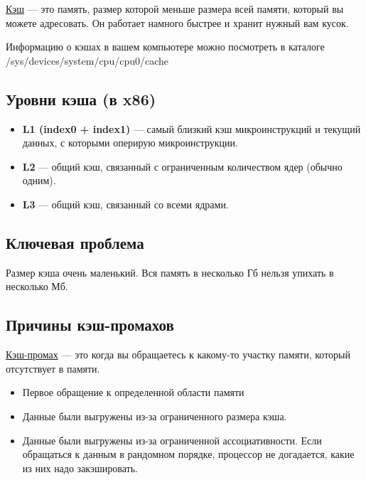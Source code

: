 \begin{Def}
	\underline{Кэш} --- это память, размер которой меньше размера всей памяти, который вы
	можете адресовать. Он работает намного быстрее и хранит нужный вам кусок.
\end{Def}

Информацию о кэшах в вашем компьютере можно посмотреть в каталоге
/sys/devices/system/cpu/cpu0/cache

\subsection{Уровни кэша (в x86)}

\begin{itemize}
	\item \textbf{L1 (index0 + index1)}  --- самый близкий кэш микроинструкций и текущий данных,
	с которыми оперирую микроинструкции.
	\item \textbf{L2} --- общий кэш, связанный с ограниченным количеством ядер (обычно одним).
	\item \textbf{L3} --- общий кэш, связанный со всеми ядрами.
\end{itemize}

\subsection{Ключевая проблема}

Размер кэша очень маленький. Вся память в несколько Гб нельзя упихать в несколько Мб.

\subsection{Причины кэш-промахов}

\begin{Def}
	\underline{Кэш-промах} --- это когда вы обращаетесь к какому-то участку памяти, который
	отсутствует в памяти.
\end{Def}

\begin{itemize}
	\item Первое обращение к определенной области памяти
	\item Данные были выгружены из-за ограниченного размера кэша.
	\item Данные были выгружены из-за ограниченной ассоциативности. Если обращаться 
	к данным в рандомном порядке, процессор не догадается, какие из них надо закэшировать.
\end{itemize}

